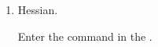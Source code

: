 \begin{enumerate}[leftmargin=*]
\begin{enumerate}
      \item Hessian.
            \begin{indication}
            Enter the command  in the .
            \end{indication}
      \end{enumerate}



\end{enumerate}
